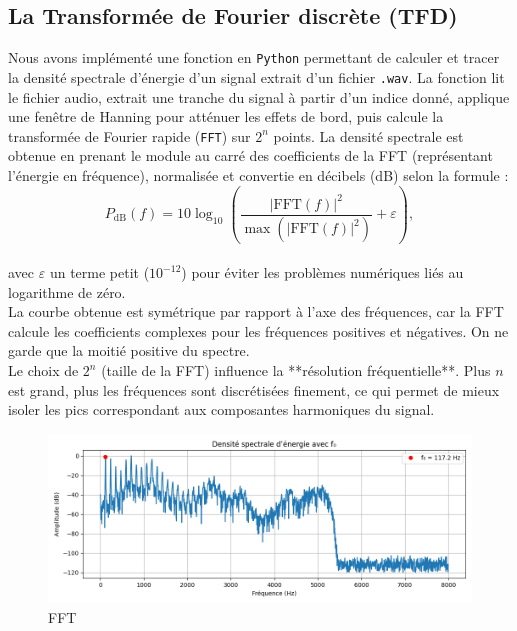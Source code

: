 \subsection{La Transformée de Fourier discrète (TFD)}

Nous avons implémenté une fonction en \texttt{Python} permettant de calculer et tracer la densité spectrale d’énergie d’un signal extrait d’un fichier \texttt{.wav}. La fonction lit le fichier audio, extrait une tranche du signal à partir d’un indice donné, applique une fenêtre de Hanning pour atténuer les effets de bord, puis calcule la transformée de Fourier rapide (\texttt{FFT}) sur $2^n$ points. La densité spectrale est obtenue en prenant le module au carré des coefficients de la FFT (représentant l’énergie en fréquence), normalisée et convertie en décibels (dB) selon la formule :
\[
P_{\mathrm{dB}}(f) = 10 \log_{10} \left( \frac{|\mathrm{FFT}(f)|^2}{\max(|\mathrm{FFT}(f)|^2)} + \varepsilon \right),
\] \\

avec $\varepsilon$ un terme petit ($10^{-12}$) pour éviter les problèmes numériques liés au logarithme de zéro.\\

La courbe obtenue est symétrique par rapport à l’axe des fréquences, car la FFT calcule les coefficients complexes pour les fréquences positives et négatives. On ne garde que la moitié positive du spectre.\\

Le choix de $2^n$ (taille de la FFT) influence la **résolution fréquentielle**. Plus $n$ est grand, plus les fréquences sont discrétisées finement, ce qui permet de mieux isoler les pics correspondant aux composantes harmoniques du signal.

\begin{figure}[h!]
    \centering
    \includegraphics[width=17cm]{screenshots/fft_detection_f0.png}
    \caption{FFT}
\end{figure}


